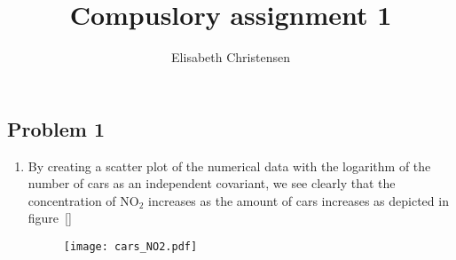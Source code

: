 \documentclass[a4paper,10pt]{article}
\title{Compuslory assignment 1}
\author{Elisabeth Christensen}
\begin{document}
\maketitle
\subsection*{Problem 1}
\begin{enumerate}[label=\alph*)]
\item By creating a scatter plot of the numerical data with the logarithm of the number of cars as an independent covariant, we see clearly that the concentration of NO$_2$ increases as the amount of cars increases as depicted in figure~\ref{}

\begin{figure}
\centering
\texttt{[image: cars\_NO2.pdf]}
\end{figure}

\end{enumerate}
\end{document}
